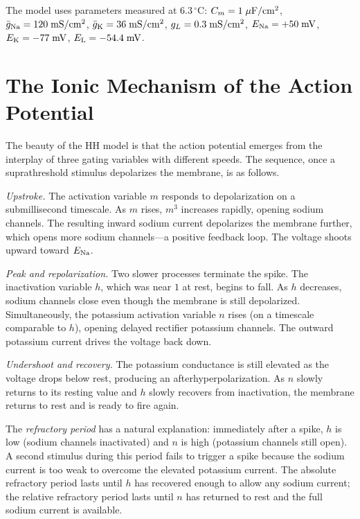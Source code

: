 The model uses parameters measured at $6.3\,^\circ\text{C}$: $C_m = 1\;\mu\text{F}/\text{cm}^2$, $\bar{g}_{\mathrm{Na}} = 120\;\text{mS}/\text{cm}^2$, $\bar{g}_{\mathrm{K}} = 36\;\text{mS}/\text{cm}^2$, $g_L = 0.3\;\text{mS}/\text{cm}^2$, $E_{\mathrm{Na}} = +50\;\text{mV}$, $E_{\mathrm{K}} = -77\;\text{mV}$, $E_{\mathrm{L}} = -54.4\;\text{mV}$.

\section{The Ionic Mechanism of the Action Potential}
\label{sec:ap-mechanism}

The beauty of the HH model is that the action potential emerges from the interplay of three gating variables with different speeds. The sequence, once a suprathreshold stimulus depolarizes the membrane, is as follows.

\emph{Upstroke.} The activation variable $m$ responds to depolarization on a submillisecond timescale. As $m$ rises, $m^3$ increases rapidly, opening sodium channels. The resulting inward sodium current depolarizes the membrane further, which opens more sodium channels---a positive feedback loop. The voltage shoots upward toward $E_{\mathrm{Na}}$.

\emph{Peak and repolarization.} Two slower processes terminate the spike. The inactivation variable $h$, which was near $1$ at rest, begins to fall. As $h$ decreases, sodium channels close even though the membrane is still depolarized. Simultaneously, the potassium activation variable $n$ rises (on a timescale comparable to $h$), opening delayed rectifier potassium channels. The outward potassium current drives the voltage back down.

\emph{Undershoot and recovery.} The potassium conductance is still elevated as the voltage drops below rest, producing an afterhyperpolarization. As $n$ slowly returns to its resting value and $h$ slowly recovers from inactivation, the membrane returns to rest and is ready to fire again.

The \emph{refractory period} has a natural explanation: immediately after a spike, $h$ is low (sodium channels inactivated) and $n$ is high (potassium channels still open). A second stimulus during this period fails to trigger a spike because the sodium current is too weak to overcome the elevated potassium current. The absolute refractory period lasts until $h$ has recovered enough to allow any sodium current; the relative refractory period lasts until $n$ has returned to rest and the full sodium current is available.

